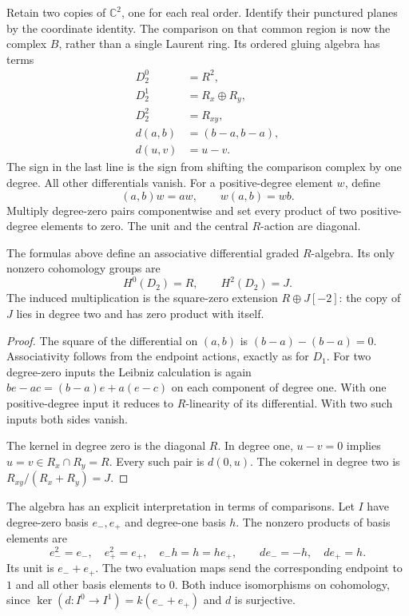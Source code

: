 Retain two copies of $\mathbb C^2$, one for each real order.
Identify their punctured planes by the coordinate identity.
The comparison on that common region is now the complex $B$,
rather than a single Laurent ring.
Its ordered gluing algebra has terms
\begin{equation}\label{eq:ocr-surface-gluing}
 \begin{split}
 D_2^0&=R^2,\\
 D_2^1&=R_x\oplus R_y,\\
 D_2^2&=R_{xy},\\
 d(a,b)&=(b-a,b-a),\\
 d(u,v)&=u-v.
 \end{split}
\end{equation}
The sign in the last line is the sign from shifting the comparison
complex by one degree. All other differentials vanish.
For a positive-degree element $w$, define
\[
 (a,b)w=aw,\qquad w(a,b)=wb.
\]
Multiply degree-zero pairs componentwise and set every product of
two positive-degree elements to zero.
The unit and the central $R$-action are diagonal.

\begin{proposition}\label{prop:ocr-surface-algebra}
The formulas above define an associative differential graded
$R$-algebra. Its only nonzero cohomology groups are
\[
 H^0(D_2)=R,\qquad H^2(D_2)=J.
\]
The induced multiplication is the square-zero extension
$R\oplus J[-2]$: the copy of $J$ lies in degree two and has
zero product with itself.
\end{proposition}

\begin{proof}
The square of the differential on $(a,b)$ is
$(b-a)-(b-a)=0$.
Associativity follows from the endpoint actions, exactly as for $D_1$.
For two degree-zero inputs the Leibniz calculation is again
$be-ac=(b-a)e+a(e-c)$ on each component of degree one.
With one positive-degree input it reduces to $R$-linearity of its
differential. With two such inputs both sides vanish.

The kernel in degree zero is the diagonal $R$.
In degree one, $u-v=0$ implies $u=v\in R_x\cap R_y=R$.
Every such pair is $d(0,u)$.
The cokernel in degree two is $R_{xy}/(R_x+R_y)=J$.
\end{proof}

The algebra has an explicit interpretation in terms of comparisons.
Let $I$ have degree-zero basis $e_-,e_+$ and degree-one basis $h$.
The nonzero products of basis elements are
\[
 e_-^2=e_-,\quad e_+^2=e_+,\quad e_-h=h=he_+,
 \qquad de_-=-h,\quad de_+=h.
\]
Its unit is $e_-+e_+$.
The two evaluation maps send the corresponding endpoint to $1$
and all other basis elements to $0$.
Both induce isomorphisms on cohomology, since
$\ker(d:I^0\to I^1)=k(e_-+e_+)$ and $d$ is surjective.


